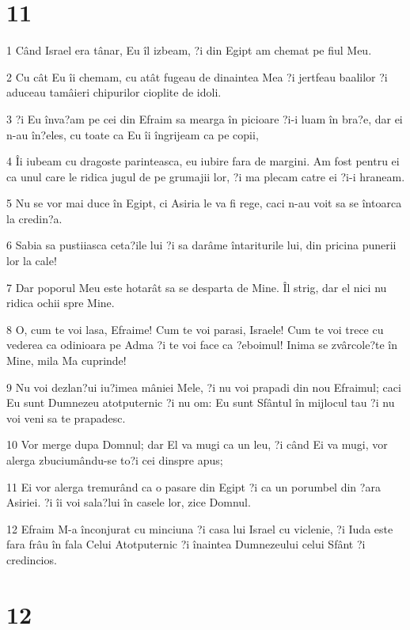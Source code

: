 \chapter{11}

\par 1 Când Israel era tânar, Eu îl izbeam, ?i din Egipt am chemat pe fiul Meu.
\par 2 Cu cât Eu îi chemam, cu atât fugeau de dinaintea Mea ?i jertfeau baalilor ?i aduceau tamâieri chipurilor cioplite de idoli.
\par 3 ?i Eu înva?am pe cei din Efraim sa mearga în picioare ?i-i luam în bra?e, dar ei n-au în?eles, cu toate ca Eu îi îngrijeam ca pe copii,
\par 4 Îi iubeam cu dragoste parinteasca, eu iubire fara de margini. Am fost pentru ei ca unul care le ridica jugul de pe grumajii lor, ?i ma plecam catre ei ?i-i hraneam.
\par 5 Nu se vor mai duce în Egipt, ci Asiria le va fi rege, caci n-au voit sa se întoarca la credin?a.
\par 6 Sabia sa pustiiasca ceta?ile lui ?i sa darâme întariturile lui, din pricina punerii lor la cale!
\par 7 Dar poporul Meu este hotarât sa se desparta de Mine. Îl strig, dar el nici nu ridica ochii spre Mine.
\par 8 O, cum te voi lasa, Efraime! Cum te voi parasi, Israele! Cum te voi trece cu vederea ca odinioara pe Adma ?i te voi face ca ?eboimul! Inima se zvârcole?te în Mine, mila Ma cuprinde!
\par 9 Nu voi dezlan?ui iu?imea mâniei Mele, ?i nu voi prapadi din nou Efraimul; caci Eu sunt Dumnezeu atotputernic ?i nu om: Eu sunt Sfântul în mijlocul tau ?i nu voi veni sa te prapadesc.
\par 10 Vor merge dupa Domnul; dar El va mugi ca un leu, ?i când Ei va mugi, vor alerga zbuciumându-se to?i cei dinspre apus;
\par 11 Ei vor alerga tremurând ca o pasare din Egipt ?i ca un porumbel din ?ara Asiriei. ?i îi voi sala?lui în casele lor, zice Domnul.
\par 12 Efraim M-a înconjurat cu minciuna ?i casa lui Israel cu viclenie, ?i Iuda este fara frâu în fala Celui Atotputernic ?i înaintea Dumnezeului celui Sfânt ?i credincios.

\chapter{12}

